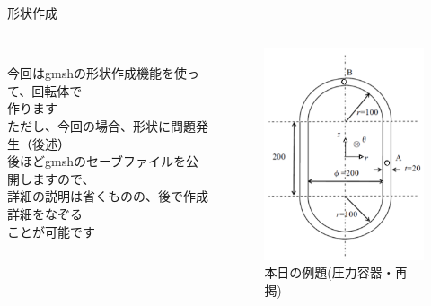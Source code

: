 \begin{frame}{形状作成}
   \begin{columns}[t]
    \begin{column}{0.65\textwidth}
      \\
      今回はgmshの形状作成機能を使って、回転体で\\
      作ります \\
      ただし、今回の場合、形状に問題発生（後述） \\
      \vspace{5mm}
      後ほどgmshのセーブファイルを公開しますので、\\
      詳細の説明は省くものの、後で作成詳細をなぞる\\
      ことが可能です
    \end{column}
    \begin{column}{0.35\textwidth}
      \begin{figure}[htbp]
        \begin{center}
          \includegraphics[keepaspectratio,scale=2.2]{images/example-probrem.png}
            \caption{本日の例題(圧力容器・再掲)}
        \end{center}
      \end{figure}
    \end{column}
  \end{columns}
\end{frame}
